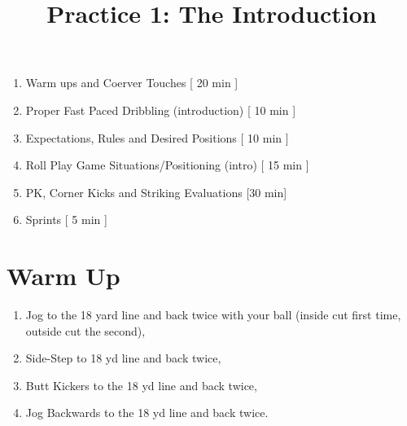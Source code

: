 \documentclass[10pt,letterpaper]{article}
\title{\vspace{-.5in}Practice 1: The Introduction}
\author{}
\date{}
\newenvironment{agendablock}[1]{%
    \tcolorbox[beamer,%
    noparskip,breakable,
    colback=LightGray,colframe=Black,%
    colbacklower=Gray!75!LightGray,%
    title=#1]}%
    {\endtcolorbox}
\newenvironment{myalertblock}[1]{%
    \tcolorbox[beamer,%
    noparskip,breakable,
    colback=LightCoral,colframe=DarkRed,%
    colbacklower=Tomato!75!LightCoral,%
    title=#1]}%
    {\endtcolorbox}
\begin{document}
\selectfont
\maketitle

\begin{agendablock}{Practice Activities}
    \begin{enumerate}
        \item Warm ups and Coerver Touches [ 20 min ]
        \item Proper Fast Paced Dribbling (introduction) [ 10 min ]
        \item Expectations, Rules and Desired Positions [ 10 min ]
        \item Roll Play Game Situations/Positioning (intro) [ 15 min ]
        \item PK, Corner Kicks and Striking Evaluations [30 min]
        \item Sprints [ 5 min ] 
    \end{enumerate}

\end{agendablock}

\section{Warm Up}

\begin{myalertblock}{Warm Ups (5 min) }
    \begin{enumerate}
        \item Jog to the 18 yard line and back twice with your ball (inside cut first time, outside cut the second),
        \item Side-Step to 18 yd line and back twice,
        \item Butt Kickers to the 18 yd line and back twice,
        \item Jog Backwards to the 18 yd line and back twice.
    \end{enumerate}
\end{myalertblock}
\end{document}
